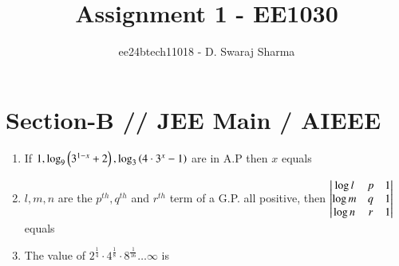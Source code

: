\documentclass[journal,12pt,twocolumn]{IEEEtran}
\theoremstyle{remark}
\begin{document}

\vspace{3cm}

\title{Assignment 1 - EE1030}
\author{ee24btech11018 - D. Swaraj Sharma}
\maketitle
\newpage
\bigskip

\renewcommand{\thefigure}{\theenumi}
\renewcommand{\thetable}{\theenumi}

\section{\textbf{Section-B} // \textbf{JEE Main} / \textbf{AIEEE}}

\begin{enumerate}[label={\arabic*.}]


\item {If $ 1, \log_9 \left(3^{1-x} +2\right), \log_3 \left(4\cdot3^x -1\right)$ are in A.P then $x$ equals}
{\hfill{}}
\begin{enumerate}[label={\brak{\alph*}}]
\end{enumerate}
\item {$l, m, n$ are the $p^{th}, q^{th}$ and $r^{th}$ term of a G.P. all positive, then $\begin{vmatrix}\log l & p & 1 \\ \log m & q & 1 \\ \log n & r & 1 \end{vmatrix}$ equals}
{\hfill{}} 
\begin{enumerate}[label={\brak{\alph*}}]
\end{enumerate}

\item {The value of $2^{\frac{1}{4}}\cdot 4^{\frac{1}{8}}\cdot 8^{\frac{1}{16}} \ldots \infty$ is}
{\hfill{}} 
\begin{enumerate}[label={\brak{\alph*}}]
	\begin{multicols}{2}
\item  {$1$}
\item  {$2$}
\item  {$\frac{3}{2}$}
\item  {$4$}
	\end{multicols}
\end{enumerate}


\end{enumerate}
\end{document}
